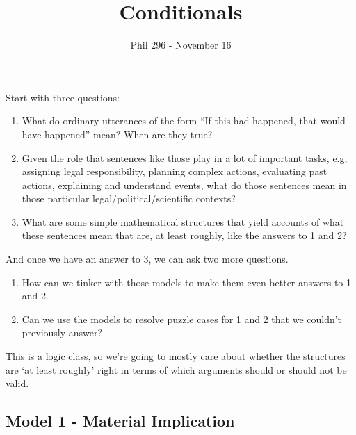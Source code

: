 \documentclass[
]{article}
\title{Conditionals}
\author{Phil 296 - November 16}
\date{}
\providecommand{\tightlist}{%
  \setlength{\itemsep}{0pt}\setlength{\parskip}{0pt}}\usepackage{longtable,booktabs,array}
\begin{document}
\maketitle
\ifdefined\Shaded\renewenvironment{Shaded}{\begin{tcolorbox}[breakable, sharp corners, enhanced, interior hidden, borderline west={3pt}{0pt}{shadecolor}, frame hidden, boxrule=0pt]}{\end{tcolorbox}}\fi

Start with three questions:

\begin{enumerate}
\def\labelenumi{\arabic{enumi}.}
\tightlist
\item
  What do ordinary utterances of the form ``If this had happened, that
  would have happened'' mean? When are they true?
\item
  Given the role that sentences like those play in a lot of important
  tasks, e.g, assigning legal responsibility, planning complex actions,
  evaluating past actions, explaining and understand events, what do
  those sentences mean in those particular legal/political/scientific
  contexts?
\item
  What are some simple mathematical structures that yield accounts of
  what these sentences mean that are, at least roughly, like the answers
  to 1 and 2?
\end{enumerate}

And once we have an answer to 3, we can ask two more questions.

\begin{enumerate}
\def\labelenumi{\arabic{enumi}.}
\setcounter{enumi}{3}
\tightlist
\item
  How can we tinker with those models to make them even better answers
  to 1 and 2.
\item
  Can we use the models to resolve puzzle cases for 1 and 2 that we
  couldn't previously answer?
\end{enumerate}

This is a logic class, so we're going to mostly care about whether the
structures are `at least roughly' right in terms of which arguments
should or should not be valid.

\hypertarget{model-1---material-implication}{%
\subsection{Model 1 - Material
Implication}\label{model-1---material-implication}}
\end{document}
